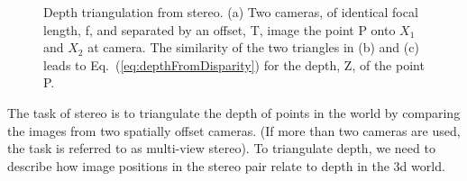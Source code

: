 \begin{figure}
    \centerline{
        }
    \centerline{
    }
    \caption{Depth triangulation from stereo. (a) Two cameras, of identical focal length, f, and separated by an offset, T, image the point P onto $X_1$ and $X_2$ at camera.  The similarity of the two triangles in (b) and (c) leads to Eq.~(\ref{eq:depthFromDisparity}) for the depth, Z, of the point P.}
    \label{fig:stereo}
\end{figure}

The task of stereo is to triangulate the depth of points in the world by comparing the images from two spatially offset cameras.  (If more than two cameras are used, the task is referred to as multi-view stereo).  To triangulate depth, we need to describe how image positions in the stereo pair relate to depth in the 3d world.


